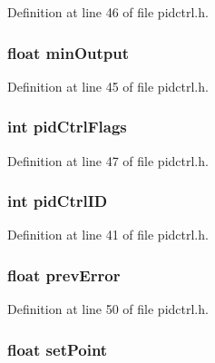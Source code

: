 Definition at line 46 of file pidctrl.h.

\hypertarget{struct_p_i_d_c_t_r_l_aa600beb284fe9eb85dd0e23dbb76ea12}{
\subsubsection[{minOutput}]{\setlength{\rightskip}{0pt plus 5cm}float {\bf minOutput}}}
\label{struct_p_i_d_c_t_r_l_aa600beb284fe9eb85dd0e23dbb76ea12}


Definition at line 45 of file pidctrl.h.

\hypertarget{struct_p_i_d_c_t_r_l_a22df833968e881351b347f467627da04}{
\subsubsection[{pidCtrlFlags}]{\setlength{\rightskip}{0pt plus 5cm}int {\bf pidCtrlFlags}}}
\label{struct_p_i_d_c_t_r_l_a22df833968e881351b347f467627da04}


Definition at line 47 of file pidctrl.h.

\hypertarget{struct_p_i_d_c_t_r_l_a476d031d1a50fa42f1cebebf6e19d8a2}{
\subsubsection[{pidCtrlID}]{\setlength{\rightskip}{0pt plus 5cm}int {\bf pidCtrlID}}}
\label{struct_p_i_d_c_t_r_l_a476d031d1a50fa42f1cebebf6e19d8a2}


Definition at line 41 of file pidctrl.h.

\hypertarget{struct_p_i_d_c_t_r_l_a39a4faa3bd5fbec63bad922745e90e53}{
\subsubsection[{prevError}]{\setlength{\rightskip}{0pt plus 5cm}float {\bf prevError}}}
\label{struct_p_i_d_c_t_r_l_a39a4faa3bd5fbec63bad922745e90e53}


Definition at line 50 of file pidctrl.h.

\hypertarget{struct_p_i_d_c_t_r_l_a63d3c3044414027c2686db00ea9cca32}{
\subsubsection[{setPoint}]{\setlength{\rightskip}{0pt plus 5cm}float {\bf setPoint}}}
\label{struct_p_i_d_c_t_r_l_a63d3c3044414027c2686db00ea9cca32}


